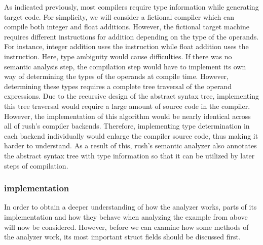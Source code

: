 As indicated previously, most compilers require type information while
generating target code. For simplicity, we will consider a fictional compiler
which can compile both integer and float additions. However, the fictional
target machine requires different instructions for addition depending on the
type of the operands. For instance, integer addition uses the  instruction
while float addition uses the  instruction. Here, type ambiguity would
cause difficulties. If there was no semantic analysis step, the compilation step would
have to implement its own way of determining the types of the operands at
compile time. However, determining these types requires a complete
tree traversal of the operand expressions. Due to the recursive design of the
abstract syntax tree, implementing this tree traversal would require a large amount of source code in the compiler.
However, the implementation of this algorithm would be nearly identical across all of rush's compiler
backends. Therefore, implementing type determination in each backend
individually would enlarge the compiler source code, thus making it harder to
understand. As a result of this, rush's semantic analyzer also annotates the abstract syntax tree with type
information so that it can be utilized by later steps of compilation.

\subsubsection{implementation}

In order to obtain a deeper understanding of how the analyzer works, parts of its implementation and how they behave when analyzing the
example from above will now be considered. However, before we can examine how some methods of the analyzer work,
its most important struct fields should be discussed first.



